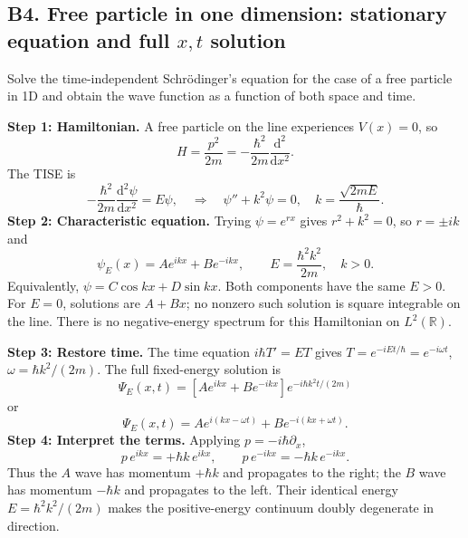 \documentclass[11pt,a4paper]{article}
\newcommand{\dd}{\mathrm{d}}
\newcommand{\R}{\mathbb R}
\begin{document}
\subsection{B4. Free particle in one dimension: stationary equation and full $x,t$ solution}
\begin{questionbox}Solve the time-independent Schr\"odinger's equation for the case of a free particle in 1D and obtain the wave function as a function of both space and time.\end{questionbox}
\textbf{Step 1: Hamiltonian.} A free particle on the line experiences $V(x)=0$, so
\begin{equation}
H=\frac{p^2}{2m}=-\frac{\hbar^2}{2m}\frac{\dd^2}{\dd x^2}.
\end{equation}
The TISE is
\begin{equation}
-\frac{\hbar^2}{2m}\frac{\dd^2\psi}{\dd x^2}=E\psi,
\quad\Longrightarrow\quad \psi''+k^2\psi=0,\quad k=\frac{\sqrt{2mE}}\hbar.
\end{equation}
\textbf{Step 2: Characteristic equation.} Trying $\psi=e^{rx}$ gives $r^2+k^2=0$, so $r=\pm ik$ and
\begin{equation}\label{eq:free_spatial}
\boxed{\psi_E(x)=Ae^{ikx}+Be^{-ikx}},\qquad E=\frac{\hbar^2k^2}{2m},\quad k>0.
\end{equation}
Equivalently, $\psi=C\cos kx+D\sin kx$. Both components have the same $E>0$. For $E=0$, solutions are $A+Bx$; no nonzero such solution is square integrable on the line. There is no negative-energy spectrum for this Hamiltonian on $L^2(\R)$.
\par\textbf{Step 3: Restore time.} The time equation $i\hbar T'=ET$ gives $T=e^{-iEt/\hbar}=e^{-i\omega t}$, $\omega=\hbar k^2/(2m)$. The full fixed-energy solution is
\begin{equation}\label{eq:free_full}
\boxed{\Psi_E(x,t)=[Ae^{ikx}+Be^{-ikx}]e^{-i\hbar k^2t/(2m)}}
\end{equation}
or
\begin{equation}
\boxed{\Psi_E(x,t)=Ae^{i(kx-\omega t)}+Be^{-i(kx+\omega t)}}.
\end{equation}
\textbf{Step 4: Interpret the terms.} Applying $p=-i\hbar\partial_x$,
\begin{equation}
p\,e^{ikx}=+\hbar k\,e^{ikx},\qquad p\,e^{-ikx}=-\hbar k\,e^{-ikx}.
\end{equation}
Thus the $A$ wave has momentum $+\hbar k$ and propagates to the right; the $B$ wave has momentum $-\hbar k$ and propagates to the left. Their identical energy $E=\hbar^2k^2/(2m)$ makes the positive-energy continuum doubly degenerate in direction.
\end{document}
